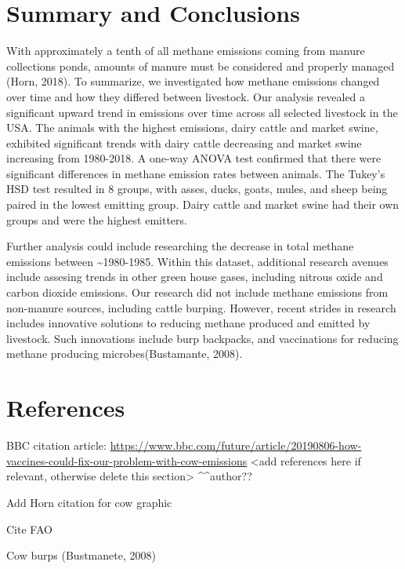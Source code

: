 \documentclass[
  12pt,
]{article}
\begin{document}
\newpage

\hypertarget{summary-and-conclusions}{%
\section{Summary and Conclusions}\label{summary-and-conclusions}}

With approximately a tenth of all methane emissions coming from manure
collections ponds, amounts of manure must be considered and properly
managed (Horn, 2018). To summarize, we investigated how methane
emissions changed over time and how they differed between livestock. Our
analysis revealed a significant upward trend in emissions over time
across all selected livestock in the USA. The animals with the highest
emissions, dairy cattle and market swine, exhibited significant trends
with dairy cattle decreasing and market swine increasing from 1980-2018.
A one-way ANOVA test confirmed that there were significant differences
in methane emission rates between animals. The Tukey's HSD test resulted
in 8 groups, with asses, ducks, goats, mules, and sheep being paired in
the lowest emitting group. Dairy cattle and market swine had their own
groups and were the highest emitters.

Further analysis could include researching the decrease in total methane
emissions between \textasciitilde1980-1985. Within this dataset,
additional research avenues include assesing trends in other green house
gases, including nitrous oxide and carbon dioxide emissions. Our
research did not include methane emissions from non-manure sources,
including cattle burping. However, recent strides in research includes
innovative solutions to reducing methane produced and emitted by
livestock. Such innovations include burp backpacks, and vaccinations for
reducing methane producing microbes(Bustamante, 2008).

\newpage

\hypertarget{references}{%
\section{References}\label{references}}

BBC citation article:
\url{https://www.bbc.com/future/article/20190806-how-vaccines-could-fix-our-problem-with-cow-emissions}
\textless add references here if relevant, otherwise delete this
section\textgreater{} \^{}\^{}author??

Add Horn citation for cow graphic

Cite FAO

Cow burps (Bustmanete, 2008)
\end{document}
